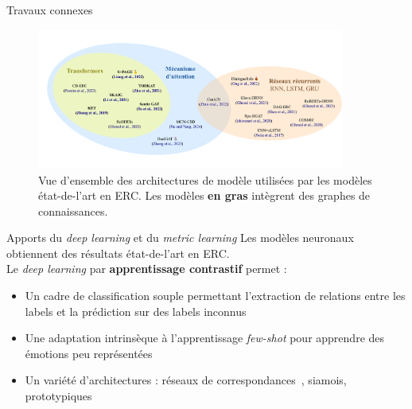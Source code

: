 \documentclass[11pt,aspectratio=169]{beamer}
\begin{document}
\begin{frame}{Travaux connexes}
    \begin{figure}
        \centering
        \caption{\centering Vue d'ensemble des architectures de modèle utilisées par les modèles état-de-l'art en ERC. Les modèles \textbf{en gras} intègrent des graphes de connaissances.}
        \includegraphics[width=0.9\textwidth]{sota-chrono-graph.png}
    \end{figure}
\end{frame}

\begin{frame}{Apports du \textsl{deep learning} et du \textsl{metric learning}}
    Les modèles neuronaux obtiennent des résultats état-de-l'art en ERC.~\\
    \vspace*{8pt}
    Le \textsl{deep learning} par \textcolor{roose}{\bf apprentissage contrastif} permet :
    \begin{itemize}
        \item Un cadre de classification souple permettant l'extraction de relations entre les labels et la prédiction sur des labels inconnus%
        \item Une adaptation intrinsèque à l'apprentissage \textsl{few-shot} pour apprendre des émotions peu représentées
        \item Un variété d'architectures : réseaux de correspondances~, siamois, prototypiques~ %
    \end{itemize}
\end{frame}
\end{document}
